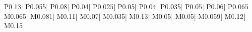 \def\DeclareTableColumnSpecs#1#2#3{%
    \expandafter\def\csname tablecols@#1@twocol\endcsname{#2}%
    \expandafter\def\csname tablecols@#1@onecol\endcsname{#3}%
}

\ifdefined\JOURNALTWOCOLUMN
    \def\TableColumnSpecs#1{\csname tablecols@#1@twocol\endcsname}
\else
    \def\TableColumnSpecs#1{\csname tablecols@#1@onecol\endcsname}
\fi



\DeclareTableColumnSpecs{aor:lit-review}{
    P{0.13\linewidth}| %
    P{0.055\linewidth}| %
    P{0.08\linewidth}| %
    P{0.04\linewidth}| %
    P{0.025\linewidth}| %
    P{0.05\linewidth}| %
    P{0.04\linewidth}| %
    P{0.035\linewidth}| %
    P{0.05\linewidth}| %
    P{0.06\linewidth}| %
    P{0.065\linewidth} %
}{
    M{0.065\linewidth}| %
    M{0.081\linewidth}| %
    M{0.11\linewidth}| %
    M{0.07\linewidth}| %
    M{0.035\linewidth}| %
    M{0.13\linewidth}| %
    M{0.05\linewidth}| %
    M{0.05\linewidth}| %
    M{0.059\linewidth}| %
    M{0.12\linewidth}| %
    M{0.15\linewidth} %
}

